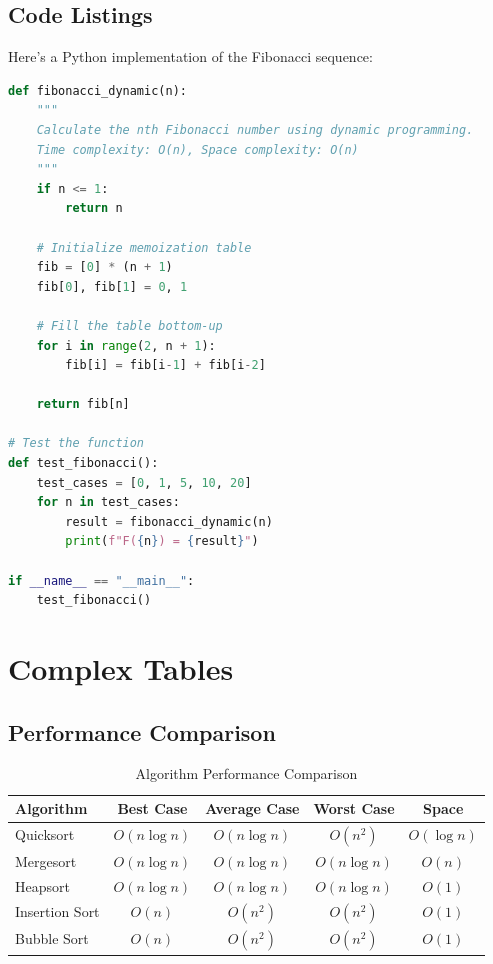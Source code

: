 \documentclass[12pt,a4paper,twoside]{article}
\theoremstyle{definition}
\begin{document}
\subsection{Code Listings}

Here's a Python implementation of the Fibonacci sequence:

\begin{lstlisting}[language=Python, caption={Fibonacci Implementation}]
def fibonacci_dynamic(n):
    """
    Calculate the nth Fibonacci number using dynamic programming.
    Time complexity: O(n), Space complexity: O(n)
    """
    if n <= 1:
        return n
    
    # Initialize memoization table
    fib = [0] * (n + 1)
    fib[0], fib[1] = 0, 1
    
    # Fill the table bottom-up
    for i in range(2, n + 1):
        fib[i] = fib[i-1] + fib[i-2]
    
    return fib[n]

# Test the function
def test_fibonacci():
    test_cases = [0, 1, 5, 10, 20]
    for n in test_cases:
        result = fibonacci_dynamic(n)
        print(f"F({n}) = {result}")

if __name__ == "__main__":
    test_fibonacci()
\end{lstlisting}

\section{Complex Tables}

\subsection{Performance Comparison}

\begin{table}[H]
\centering
\caption{Algorithm Performance Comparison}
\label{tab:performance}
\begin{tabular}{@{}lcccc@{}}
\toprule
\textbf{Algorithm} & \textbf{Best Case} & \textbf{Average Case} & \textbf{Worst Case} & \textbf{Space} \\
\midrule
Quicksort & $O(n \log n)$ & $O(n \log n)$ & $O(n^2)$ & $O(\log n)$ \\
Mergesort & $O(n \log n)$ & $O(n \log n)$ & $O(n \log n)$ & $O(n)$ \\
Heapsort & $O(n \log n)$ & $O(n \log n)$ & $O(n \log n)$ & $O(1)$ \\
Insertion Sort & $O(n)$ & $O(n^2)$ & $O(n^2)$ & $O(1)$ \\
Bubble Sort & $O(n)$ & $O(n^2)$ & $O(n^2)$ & $O(1)$ \\
\bottomrule
\end{tabular}
\end{table}
\end{document}
